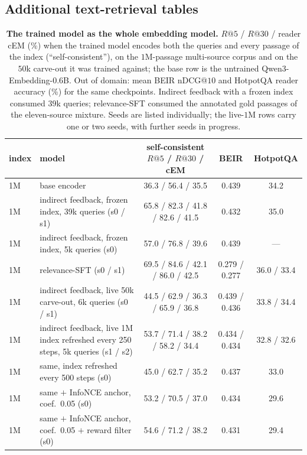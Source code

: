 \subsection{Additional text-retrieval tables}
\label{app:rag_text_tables}

\begin{table}[H]
\centering\small
\caption{\textbf{The trained model as the whole embedding model.} $R@5$ / $R@30$ / reader cEM (\%) when the
trained model encodes both the queries and every passage of the index (``self-consistent''), on the $1$M-passage
multi-source corpus and on the $50$k carve-out it was trained against; the base row is the untrained
Qwen3-Embedding-0.6B. Out of domain: mean BEIR nDCG@$10$ and HotpotQA reader accuracy (\%) for the same
checkpoints. Indirect feedback with a frozen index consumed $39$k queries; relevance-SFT consumed the
annotated gold passages of the eleven-source mixture. Seeds are listed individually; the live-$1$M rows carry one or two seeds, with further seeds in progress.}
\label{tab:rag_selfconsistent}
\begin{tabular}{llccc}
\toprule
index & model & self-consistent $R@5$ / $R@30$ / cEM & BEIR & HotpotQA \\
\midrule
1M & base encoder & 36.3 / 56.4 / 35.5 & 0.439 & 34.2 \\
1M & indirect feedback, frozen index, 39k queries (s0 / s1) & 65.8 / 82.3 / 41.8 \quad 65.9 / 82.6 / 41.5 & 0.432 & 35.0 \\
1M & indirect feedback, frozen index, 5k queries (s0) & 57.0 / 76.8 / 39.6 & 0.439 & --- \\
1M & relevance-SFT (s0 / s1) & 69.5 / 84.6 / 42.1 \quad 71.1 / 86.0 / 42.5 & 0.279 / 0.277 & 36.0 / 33.4 \\
1M & indirect feedback, live 50k carve-out, 6k queries (s0 / s1) & 44.5 / 62.9 / 36.3 \quad 47.4 / 65.9 / 36.8 & 0.439 / 0.436 & 33.8 / 34.4 \\
1M & indirect feedback, live 1M index refreshed every 250 steps, 5k queries (s1 / s2) & 53.7 / 71.4 / 38.2 \quad 41.7 / 58.2 / 34.4 & 0.434 / 0.434 & 32.8 / 32.6 \\
1M & \quad same, index refreshed every 500 steps (s0) & 45.0 / 62.7 / 35.2 & 0.437 & 33.0 \\
1M & \quad same $+$ InfoNCE anchor, coef.\ 0.05 (s0) & 53.2 / 70.5 / 37.0 & 0.434 & 29.6 \\
1M & \quad same $+$ InfoNCE anchor, coef.\ 0.05 $+$ reward filter (s0) & 54.6 / 71.2 / 38.2 & 0.431 & 29.4 \\

\end{tabular}
\end{table}
